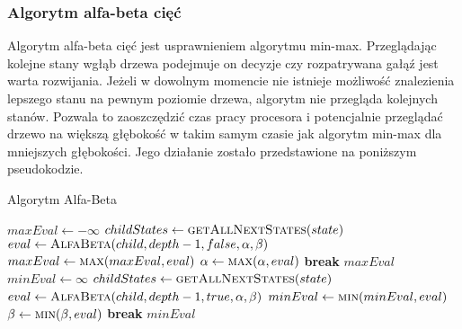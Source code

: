 \documentclass{article}
\begin{document}
	\subsubsection{Algorytm alfa-beta cięć}
	Algorytm alfa-beta cięć jest usprawnieniem algorytmu min-max. Przeglądając kolejne stany wgłąb drzewa podejmuje on decyzje czy rozpatrywana gałąź jest warta rozwijania. Jeżeli w dowolnym momencie nie istnieje możliwość znalezienia lepszego stanu na pewnym poziomie drzewa, algorytm nie przegląda kolejnych stanów. Pozwala to zaoszczędzić czas pracy procesora i potencjalnie przeglądać drzewo na większą głębokość w takim samym czasie jak algorytm min-max dla mniejszych głębokości. Jego działanie zostało przedstawione na poniższym pseudokodzie.
	\begin{algorithm}[H]
		\caption{Algorytm Alfa-Beta}
		\label{alg-alphabeta}
		\begin{algorithmic}[1]
					\State \Return {}
				\EndIf
					\State $maxEval \gets -\infty$
					\State $childStates \gets \Call{getAllNextStates}{state}$
						\State $eval \gets \Call{AlfaBeta}{child, depth-1, false, \alpha, \beta}$
						\State $maxEval \gets \Call{max}{maxEval, eval}$
						\State $\alpha \gets \Call{max}{\alpha, eval}$
						\If{$\alpha \geq \beta$}
							\State \textbf{break}
						\EndIf
					\EndFor
					\State \Return $maxEval$
				\Else
					\State $minEval \gets \infty$
					\State $childStates \gets \Call{getAllNextStates}{state}$
						\State $eval \gets \Call{AlfaBeta}{child, depth-1, true, \alpha, \beta}$
						\State $minEval \gets \Call{min}{minEval, eval}$
						\State $\beta \gets \Call{min}{\beta, eval}$
						\If{$\alpha \geq \beta$}
							\State \textbf{break}
						\EndIf
					\EndFor
					\State \Return $minEval$
				\EndIf
			\EndFunction
		\end{algorithmic}
	\end{algorithm}
\end{document}
